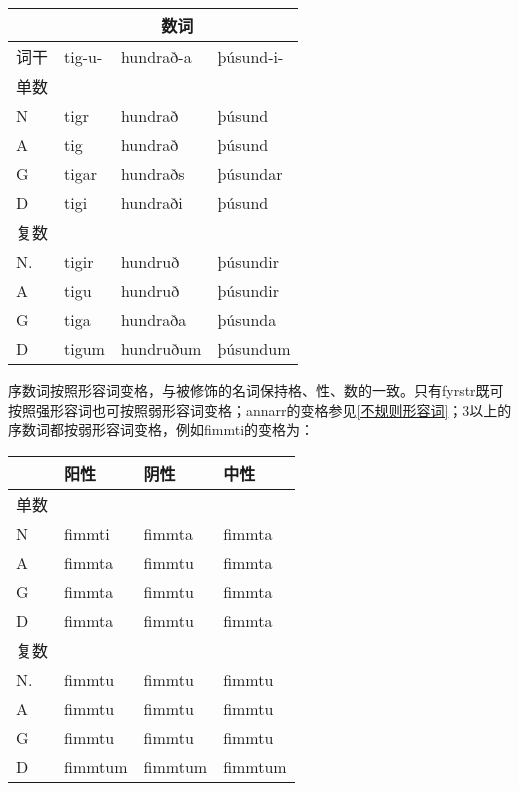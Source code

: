 {{\begin{longtable}{llll}
  \toprule
     & \multicolumn{3}{c}{数词}                         \\
  \midrule
  \endhead
  \bottomrule
  \endfoot
  词干 & tig-u-                 & hundrað-a & þúsund-i- \\
  单数 &                        &           &           \\
  N  & tigr                   & hundrað   & þúsund    \\
  A  & tig                    & hundrað   & þúsund    \\
  G  & tigar                  & hundraðs  & þúsundar  \\
  D  & tigi                   & hundraði  & þúsund    \\
  复数 &                        &           &           \\
  N. & tigir                  & hundruð   & þúsundir  \\
  A  & tigu                   & hundruð   & þúsundir  \\
  G  & tiga                   & hundraða  & þúsunda   \\
  D  & tigum                  & hundruðum & þúsundum  \\
\end{longtable}

序数词按照形容词变格，与被修饰的名词保持格、性、数的一致。只有fyrstr既可按照强形容词也可按照弱形容词变格；annarr的变格参见\ref{不规则形容词}；3以上的序数词都按弱形容词变格，例如fimmti的变格为：

\begin{longtable}{llll}
  \toprule
     & 阳性      & 阴性      & 中性      \\
  \midrule
  \endhead
  \bottomrule
  \endfoot
  单数 &         &         &         \\
  N  & fimmti  & fimmta  & fimmta  \\
  A  & fimmta  & fimmtu  & fimmta  \\
  G  & fimmta  & fimmtu  & fimmta  \\
  D  & fimmta  & fimmtu  & fimmta  \\
  复数 &         &         &         \\
  N. & fimmtu  & fimmtu  & fimmtu  \\
  A  & fimmtu  & fimmtu  & fimmtu  \\
  G  & fimmtu  & fimmtu  & fimmtu  \\
  D  & fimmtum & fimmtum & fimmtum \\
\end{longtable}

}}

